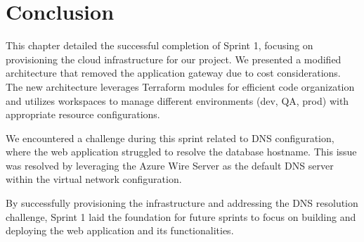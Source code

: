 \section{Conclusion}
This chapter detailed the successful completion of Sprint 1, focusing on provisioning the cloud infrastructure for our project. We presented a modified architecture that removed the application gateway due to cost considerations. The new architecture leverages Terraform modules for efficient code organization and utilizes workspaces to manage different environments (dev, QA, prod) with appropriate resource configurations.
\par
We encountered a challenge during this sprint related to DNS configuration, where the web application struggled to resolve the database hostname. This issue was resolved by leveraging the Azure Wire Server as the default DNS server within the virtual network configuration.
\par
By successfully provisioning the infrastructure and addressing the DNS resolution challenge, Sprint 1 laid the foundation for future sprints to focus on building and deploying the web application and its functionalities.
